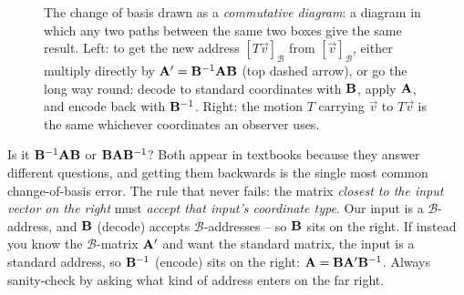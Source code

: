 \begin{figure}[H]
\caption{The change of basis drawn as a \emph{commutative diagram}: a diagram in which any two paths between the same two boxes give the same result. Left: to get the new address $[T\vec{v}]_{\mathcal{B}}$ from $[\vec{v}]_{\mathcal{B}}$, either multiply directly by $\mathbf{A}' = \mathbf{B}^{-1}\mathbf{A}\mathbf{B}$ (top dashed arrow), or go the long way round: decode to standard coordinates with $\mathbf{B}$, apply $\mathbf{A}$, and encode back with $\mathbf{B}^{-1}$. Right: the motion $T$ carrying $\vec{v}$ to $T\vec{v}$ is the same whichever coordinates an observer uses.}
\label{ch31:fig-commute}
\end{figure}

\begin{trapbox}
Is it $\mathbf{B}^{-1}\mathbf{A}\mathbf{B}$ or $\mathbf{B}\mathbf{A}\mathbf{B}^{-1}$? Both appear in
textbooks because they answer different questions, and getting them backwards is
the single most common change-of-basis error. The rule that never fails: the
matrix \emph{closest to the input vector on the right} must \emph{accept that
input's coordinate type}. Our input is a $\mathcal{B}$-address, and $\mathbf{B}$
(decode) accepts $\mathcal{B}$-addresses -- so $\mathbf{B}$ sits on the right. If
instead you know the $\mathcal{B}$-matrix $\mathbf{A}'$ and want the standard matrix,
the input is a standard address, so $\mathbf{B}^{-1}$ (encode) sits on the right:
$\mathbf{A}=\mathbf{B}\mathbf{A}'\mathbf{B}^{-1}$. Always sanity-check
by asking what kind of address enters on the far right.
\end{trapbox}

